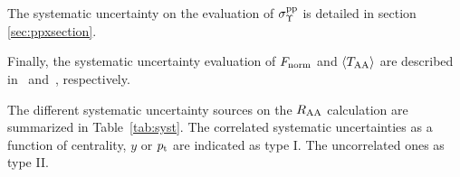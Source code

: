 The systematic uncertainty on the evaluation of $\sigma^{\rm pp}_{\Upsilon}$ is detailed in section \ref{sec:ppxsection}.

Finally, the systematic uncertainty evaluation of $F_{\rm{norm}}$ and $\langle T_{\rm{AA}}\rangle$ are described in~\cite{Adam:2016rdg} and~\cite{Abelev:2013qoq}, respectively.

The different systematic uncertainty sources on the $\mbox{$R_{\rm{AA}}$}$ calculation are summarized in Table~\ref{tab:syst}.
The correlated systematic uncertainties as a function of centrality, $y$ or $p_{\rm{t}}$ are indicated as type I. The uncorrelated ones as type II.

